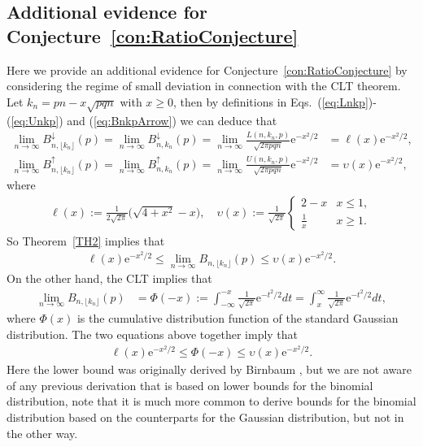 \documentclass[aop]{imsart}
\theoremstyle{plain}
\theoremstyle{remark}
\newcommand{\rme}{\mathrm{e}}
\newcommand{\1}{\operatorname{\uppercase\expandafter{\romannumeral1}}}
\newcommand{\2}{\operatorname{\uppercase\expandafter{\romannumeral2}}}
\newcommand{\3}{\operatorname{\uppercase\expandafter{\romannumeral3}}}
\newcommand{\4}{\operatorname{\uppercase\expandafter{\romannumeral4}}}
\newcommand{\5}{\operatorname{\uppercase\expandafter{\romannumeral5}}}
\newcommand{\6}{\operatorname{\uppercase\expandafter{\romannumeral6}}}
\newcommand{\7}{\operatorname{\uppercase\expandafter{\romannumeral7}}}
\newcommand{\8}{\operatorname{\uppercase\expandafter{\romannumeral8}}}
\newcommand{\9}{\operatorname{\uppercase\expandafter{\romannumeral9}}}
\def\eqref#1{\textup{(\ref{#1})}}
\newcommand{\thref}[1]{Theorem~\ref{#1}}
\newcommand{\cref}[1]{Conjecture~\ref{#1}}
\begin{document}
\subsection{Additional evidence for  \cref{con:RatioConjecture}}
Here we provide an additional evidence for \cref{con:RatioConjecture} by considering the regime of small deviation in connection with the CLT theorem. Let $k_n=pn-x\sqrt{pqn}$ with $x\geq 0$, then by definitions in Eqs.~\eqref{eq:Lnkp}-\eqref{eq:Unkp} and \eqref{eq:BnkpArrow} we can deduce that
\begin{align}
\lim_{n\to\infty }B_{n,\lfloor k_n\rfloor}^{\downarrow}(p)=\lim_{n\to\infty }B_{n,k_n}^{\downarrow}(p)=\lim_{n\to \infty} \frac{ L(n,k_n,p)}{\sqrt{2\pi pqn}}\rme^{-x^2/2}&=\ell(x)\rme^{-x^2/2},\label{eq:BnkpLBlimCLT}\\
\lim_{n\to\infty }B_{n,\lfloor k_n\rfloor}^{\uparrow}(p)=\lim_{n\to\infty }B_{n,k_n}^{\uparrow}(p)=\lim_{n\to \infty} \frac{ U(n,k_n,p)}{\sqrt{2\pi pqn}}\rme^{-x^2/2}&=\upsilon(x)\rme^{-x^2/2}, \label{eq:BnkpUBlimCLT}
\end{align}
where 
\begin{align}\label{eq:ellupsilon}
\ell(x):=\frac{1}{2\sqrt{2\pi}} \bigl(\sqrt{4 + x^2}-x\bigr), \quad \upsilon(x):=\frac{1}{\sqrt{2\pi}}\begin{cases}
2-x & x\leq 1,\\
\frac{1}{x} &x\geq 1.
\end{cases}
\end{align}
So  \thref{TH2} implies that 
\begin{align}
\ell(x)\rme^{-x^2/2}\leq \lim_{n\to\infty }B_{n,\lfloor k_n\rfloor}(p)\leq \upsilon(x)\rme^{-x^2/2}. \label{eq:nknLimLUB}
\end{align}
On the  other hand, the CLT implies that
\begin{align}
\lim_{n\to\infty }B_{n,\lfloor k_n\rfloor}(p)&=\Phi(-x):=\int_{-\infty}^{-x} \frac{1}{\sqrt{2\pi}}\rme^{-t^2/2}dt=\int_{x}^{\infty} \frac{1}{\sqrt{2\pi}}\rme^{-t^2/2}dt, \label{eq:BnkpLimCLT}
\end{align}
where $\Phi(x)$ is the cumulative distribution function of the standard Gaussian distribution. 
The two equations above together imply that
\begin{align}
\ell(x)\rme^{-x^2/2}\leq\Phi(-x)\leq \upsilon(x)\rme^{-x^2/2}. \label{eq:PhixLUB}
\end{align}
Here the lower bound was originally derived by Birnbaum \cite{Birn42}, but we are not aware of any previous derivation that is based on lower bounds for the binomial distribution, note that it is much more common to derive bounds for the binomial distribution based on the counterparts for the Gaussian distribution, but not in the other way.
\end{document}
